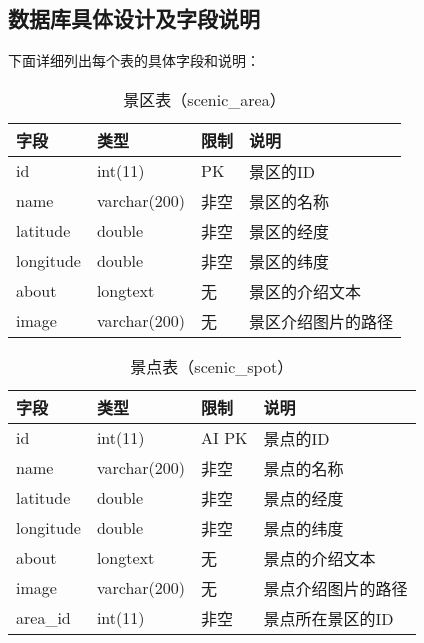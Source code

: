         \subsection{数据库具体设计及字段说明}

            下面详细列出每个表的具体字段和说明：

            \begin{table}[htbp]
                \caption{\wuhao 景区表（scenic\_area）}
                \vspace{0.5em}\centering\wuhao
                \begin{tabular}{llll}
                    \toprule[1.5pt]
                    字段 & 类型 & 限制 & 说明\\
                    \midrule[1pt]
                    id & int(11) & PK & 景区的ID\\
                    name & varchar(200) & 非空 & 景区的名称\\
                    latitude & double & 非空 & 景区的经度\\
                    longitude & double & 非空 & 景区的纬度\\
                    about & longtext & 无 & 景区的介绍文本\\
                    image & varchar(200) & 无 & 景区介绍图片的路径\\
                    \bottomrule[1.5pt]
                \end{tabular}
            \end{table}

            \begin{table}[htbp]
                \caption{\wuhao 景点表（scenic\_spot）}
                \vspace{0.5em}\centering\wuhao
                \begin{tabular}{llll}
                    \toprule[1.5pt]
                    字段 & 类型 & 限制 & 说明\\
                    \midrule[1pt]
                    id & int(11) & AI PK & 景点的ID\\
                    name & varchar(200) & 非空 & 景点的名称\\
                    latitude & double & 非空 & 景点的经度\\
                    longitude & double & 非空 & 景点的纬度\\
                    about & longtext & 无 & 景点的介绍文本\\
                    image & varchar(200) & 无 & 景点介绍图片的路径\\
                    area\_id & int(11) & 非空 & 景点所在景区的ID\\
                    \bottomrule[1.5pt]
                \end{tabular}
            \end{table}

